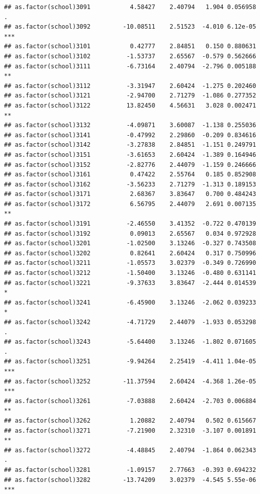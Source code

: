 \documentclass[ignorenonframetext,]{beamer}
\begin{document}
\begin{frame}[fragile]{}
\begin{verbatim}
## as.factor(school)3091           4.58427    2.40794   1.904 0.056958 .  
## as.factor(school)3092         -10.08511    2.51523  -4.010 6.12e-05 ***
## as.factor(school)3101           0.42777    2.84851   0.150 0.880631    
## as.factor(school)3102          -1.53737    2.65567  -0.579 0.562666    
## as.factor(school)3111          -6.73164    2.40794  -2.796 0.005188 ** 
## as.factor(school)3112          -3.31947    2.60424  -1.275 0.202460    
## as.factor(school)3121          -2.94700    2.71279  -1.086 0.277352    
## as.factor(school)3122          13.82450    4.56631   3.028 0.002471 ** 
## as.factor(school)3132          -4.09871    3.60087  -1.138 0.255036    
## as.factor(school)3141          -0.47992    2.29860  -0.209 0.834616    
## as.factor(school)3142          -3.27838    2.84851  -1.151 0.249791    
## as.factor(school)3151          -3.61653    2.60424  -1.389 0.164946    
## as.factor(school)3152          -2.82776    2.44079  -1.159 0.246666    
## as.factor(school)3161           0.47422    2.55764   0.185 0.852908    
## as.factor(school)3162          -3.56233    2.71279  -1.313 0.189153    
## as.factor(school)3171           2.68367    3.83647   0.700 0.484243    
## as.factor(school)3172           6.56795    2.44079   2.691 0.007135 ** 
## as.factor(school)3191          -2.46550    3.41352  -0.722 0.470139    
## as.factor(school)3192           0.09013    2.65567   0.034 0.972928    
## as.factor(school)3201          -1.02500    3.13246  -0.327 0.743508    
## as.factor(school)3202           0.82641    2.60424   0.317 0.750996    
## as.factor(school)3211          -1.05573    3.02379  -0.349 0.726990    
## as.factor(school)3212          -1.50400    3.13246  -0.480 0.631141    
## as.factor(school)3221          -9.37633    3.83647  -2.444 0.014539 *  
## as.factor(school)3241          -6.45900    3.13246  -2.062 0.039233 *  
## as.factor(school)3242          -4.71729    2.44079  -1.933 0.053298 .  
## as.factor(school)3243          -5.64400    3.13246  -1.802 0.071605 .  
## as.factor(school)3251          -9.94264    2.25419  -4.411 1.04e-05 ***
## as.factor(school)3252         -11.37594    2.60424  -4.368 1.26e-05 ***
## as.factor(school)3261          -7.03888    2.60424  -2.703 0.006884 ** 
## as.factor(school)3262           1.20882    2.40794   0.502 0.615667    
## as.factor(school)3271          -7.21900    2.32310  -3.107 0.001891 ** 
## as.factor(school)3272          -4.48845    2.40794  -1.864 0.062343 .  
## as.factor(school)3281          -1.09157    2.77663  -0.393 0.694232    
## as.factor(school)3282         -13.74209    3.02379  -4.545 5.55e-06 ***

\end{verbatim}
\end{frame}
\end{document}
